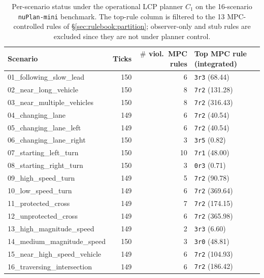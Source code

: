 \begin{table}[t]
    \centering
    \caption{Per-scenario status under the operational LCP planner $C_1$ on the 16-scenario \texttt{nuPlan-mini} benchmark. The top-rule column is filtered to the 13 MPC-controlled rules of \S\ref{sec:rulebook:partition}; observer-only and stub rules are excluded since they are not under planner control.}
    \label{tab:per_scenario_status}
    \footnotesize
\begin{tabular}{lrrl}
\toprule
Scenario & Ticks & $\#$ viol.\ MPC rules & Top MPC rule (integrated) \\
\midrule
01\_following\_slow\_lead & 150 & 6 & \texttt{3r3} (68.44) \\
02\_near\_long\_vehicle & 150 & 8 & \texttt{7r2} (131.28) \\
03\_near\_multiple\_vehicles & 150 & 8 & \texttt{7r2} (316.43) \\
04\_changing\_lane & 149 & 6 & \texttt{7r2} (40.54) \\
05\_changing\_lane\_left & 149 & 6 & \texttt{7r2} (40.54) \\
06\_changing\_lane\_right & 150 & 3 & \texttt{3r5} (0.82) \\
07\_starting\_left\_turn & 150 & 10 & \texttt{7r1} (48.00) \\
08\_starting\_right\_turn & 150 & 3 & \texttt{0r3} (0.71) \\
09\_high\_speed\_turn & 149 & 5 & \texttt{7r2} (90.78) \\
10\_low\_speed\_turn & 149 & 6 & \texttt{7r2} (369.64) \\
11\_protected\_cross & 149 & 7 & \texttt{7r2} (174.15) \\
12\_unprotected\_cross & 149 & 6 & \texttt{7r2} (365.98) \\
13\_high\_magnitude\_speed & 149 & 2 & \texttt{3r3} (6.60) \\
14\_medium\_magnitude\_speed & 150 & 3 & \texttt{3r0} (48.81) \\
15\_near\_high\_speed\_vehicle & 149 & 6 & \texttt{7r2} (104.93) \\
16\_traversing\_intersection & 149 & 6 & \texttt{7r2} (186.42) \\
\bottomrule
\end{tabular}
\end{table}
